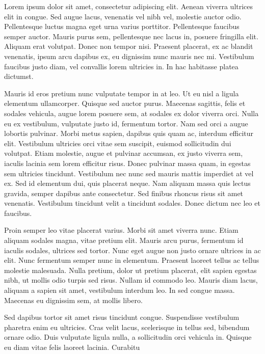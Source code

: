\documentclass[paper=a4, fontsize=12pt, twoside, openright, titlepage=firstiscover, chapterprefix=true, headings=twolinechapter, headings=big, DIV=10]{scrbook}
\begin{document}
\newpage

Lorem ipsum dolor sit amet, consectetur adipiscing elit. Aenean viverra ultrices elit in congue. Sed augue lacus, venenatis vel nibh vel, molestie auctor odio. Pellentesque luctus magna eget urna varius porttitor. Pellentesque faucibus semper auctor. Mauris purus sem, pellentesque nec lacus in, posuere fringilla elit. Aliquam erat volutpat. Donec non tempor nisi. Praesent placerat, ex ac blandit venenatis, ipsum arcu dapibus ex, eu dignissim nunc mauris nec mi. Vestibulum faucibus justo diam, vel convallis lorem ultricies in. In hac habitasse platea dictumst.

Mauris id eros pretium nunc vulputate tempor in at leo. Ut eu nisl a ligula elementum ullamcorper. Quisque sed auctor purus. Maecenas sagittis, felis et sodales vehicula, augue lorem posuere sem, at sodales ex dolor viverra orci. Nulla eu ex vestibulum, vulputate justo id, fermentum tortor. Nam sed orci a augue lobortis pulvinar. Morbi metus sapien, dapibus quis quam ac, interdum efficitur elit. Vestibulum ultricies orci vitae sem suscipit, euismod sollicitudin dui volutpat. Etiam molestie, augue et pulvinar accumsan, ex justo viverra sem, iaculis lacinia sem lorem efficitur risus. Donec pulvinar massa quam, in egestas sem ultricies tincidunt. Vestibulum nec nunc sed mauris mattis imperdiet at vel ex. Sed id elementum dui, quis placerat neque. Nam aliquam massa quis lectus gravida, semper dapibus ante consectetur. Sed finibus rhoncus risus sit amet venenatis. Vestibulum tincidunt velit a tincidunt sodales. Donec dictum nec leo et faucibus.

Proin semper leo vitae placerat varius. Morbi sit amet viverra nunc. Etiam aliquam sodales magna, vitae pretium elit. Mauris arcu purus, fermentum id iaculis sodales, ultrices sed tortor. Nunc eget augue non justo ornare ultrices in ac elit. Nunc fermentum semper nunc in elementum. Praesent laoreet tellus ac tellus molestie malesuada. Nulla pretium, dolor ut pretium placerat, elit sapien egestas nibh, ut mollis odio turpis sed risus. Nullam id commodo leo. Mauris diam lacus, aliquam a sapien sit amet, vestibulum interdum leo. In sed congue massa. Maecenas eu dignissim sem, at mollis libero.

Sed dapibus tortor sit amet risus tincidunt congue. Suspendisse vestibulum pharetra enim eu ultricies. Cras velit lacus, scelerisque in tellus sed, bibendum ornare odio. Duis vulputate ligula nulla, a sollicitudin orci vehicula in. Quisque eu diam vitae felis laoreet lacinia. Curabitu\cite{test}



\printbibliography
\end{document}
